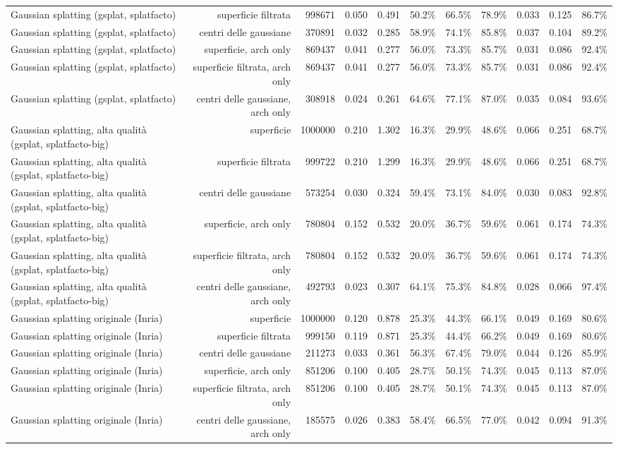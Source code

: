 \begin{tabular}{lrrrrrrrrrr}
Gaussian splatting (gsplat, splatfacto) & superficie filtrata & 998671 & 0.050 & 0.491 & 50.2\% & 66.5\% & 78.9\% & 0.033 & 0.125 & 86.7\% \\
Gaussian splatting (gsplat, splatfacto) & centri delle gaussiane & 370891 & 0.032 & 0.285 & 58.9\% & 74.1\% & 85.8\% & 0.037 & 0.104 & 89.2\% \\
Gaussian splatting (gsplat, splatfacto) & superficie, arch only & 869437 & 0.041 & 0.277 & 56.0\% & 73.3\% & 85.7\% & 0.031 & 0.086 & 92.4\% \\
Gaussian splatting (gsplat, splatfacto) & superficie filtrata, arch only & 869437 & 0.041 & 0.277 & 56.0\% & 73.3\% & 85.7\% & 0.031 & 0.086 & 92.4\% \\
Gaussian splatting (gsplat, splatfacto) & centri delle gaussiane, arch only & 308918 & 0.024 & 0.261 & 64.6\% & 77.1\% & 87.0\% & 0.035 & 0.084 & 93.6\% \\
Gaussian splatting, alta qualità (gsplat, splatfacto-big) & superficie & 1000000 & 0.210 & 1.302 & 16.3\% & 29.9\% & 48.6\% & 0.066 & 0.251 & 68.7\% \\
Gaussian splatting, alta qualità (gsplat, splatfacto-big) & superficie filtrata & 999722 & 0.210 & 1.299 & 16.3\% & 29.9\% & 48.6\% & 0.066 & 0.251 & 68.7\% \\
Gaussian splatting, alta qualità (gsplat, splatfacto-big) & centri delle gaussiane & 573254 & 0.030 & 0.324 & 59.4\% & 73.1\% & 84.0\% & 0.030 & 0.083 & 92.8\% \\
Gaussian splatting, alta qualità (gsplat, splatfacto-big) & superficie, arch only & 780804 & 0.152 & 0.532 & 20.0\% & 36.7\% & 59.6\% & 0.061 & 0.174 & 74.3\% \\
Gaussian splatting, alta qualità (gsplat, splatfacto-big) & superficie filtrata, arch only & 780804 & 0.152 & 0.532 & 20.0\% & 36.7\% & 59.6\% & 0.061 & 0.174 & 74.3\% \\
Gaussian splatting, alta qualità (gsplat, splatfacto-big) & centri delle gaussiane, arch only & 492793 & 0.023 & 0.307 & 64.1\% & 75.3\% & 84.8\% & 0.028 & 0.066 & 97.4\% \\
Gaussian splatting originale (Inria) & superficie & 1000000 & 0.120 & 0.878 & 25.3\% & 44.3\% & 66.1\% & 0.049 & 0.169 & 80.6\% \\
Gaussian splatting originale (Inria) & superficie filtrata & 999150 & 0.119 & 0.871 & 25.3\% & 44.4\% & 66.2\% & 0.049 & 0.169 & 80.6\% \\
Gaussian splatting originale (Inria) & centri delle gaussiane & 211273 & 0.033 & 0.361 & 56.3\% & 67.4\% & 79.0\% & 0.044 & 0.126 & 85.9\% \\
Gaussian splatting originale (Inria) & superficie, arch only & 851206 & 0.100 & 0.405 & 28.7\% & 50.1\% & 74.3\% & 0.045 & 0.113 & 87.0\% \\
Gaussian splatting originale (Inria) & superficie filtrata, arch only & 851206 & 0.100 & 0.405 & 28.7\% & 50.1\% & 74.3\% & 0.045 & 0.113 & 87.0\% \\
Gaussian splatting originale (Inria) & centri delle gaussiane, arch only & 185575 & 0.026 & 0.383 & 58.4\% & 66.5\% & 77.0\% & 0.042 & 0.094 & 91.3\% \\
\bottomrule
\end{tabular}
